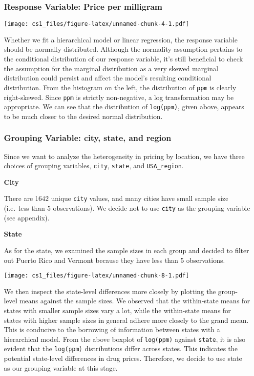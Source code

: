 \documentclass[
  11pt,
]{article}
\begin{document}
\hypertarget{response-variable-price-per-milligram}{%
\subsubsection{Response Variable: Price per
milligram}\label{response-variable-price-per-milligram}}

\texttt{[image: cs1\_files/figure-latex/unnamed-chunk-4-1.pdf]}

Whether we fit a hierarchical model or linear regression, the response
variable should be normally distributed. Although the normality
assumption pertains to the conditional distribution of our response
variable, it's still beneficial to check the assumption for the marginal
distribution as a very skewed marginal distribution could persist and
affect the model's resulting conditional distribution. From the
histogram on the left, the distribution of \texttt{ppm} is clearly
right-skewed. Since \texttt{ppm} is strictly non-negative, a log
transformation may be appropriate. We can see that the distribution of
\texttt{log(ppm)}, given above, appears to be much closer to the desired
normal distribution.

\hypertarget{grouping-variable-city-state-and-region}{%
\subsubsection{Grouping Variable: city, state, and
region}\label{grouping-variable-city-state-and-region}}

Since we want to analyze the heterogeneity in pricing by location, we
have three choices of grouping variables, \texttt{city}, \texttt{state},
and \texttt{USA\_region}.

\textbf{City}

There are 1642 unique \texttt{city} values, and many cities have small
sample size (i.e.~less than 5 observations). We decide not to use
\texttt{city} as the grouping variable (see appendix).

\textbf{State}

As for the state, we examined the sample sizes in each group and decided
to filter out Puerto Rico and Vermont because they have less than 5
observations.

\texttt{[image: cs1\_files/figure-latex/unnamed-chunk-8-1.pdf]}

We then inspect the state-level differences more closely by plotting the
group-level means against the sample sizes. We observed that the
within-state means for states with smaller sample sizes vary a lot,
while the within-state means for states with higher sample sizes in
general adhere more closely to the grand mean. This is conducive to the
borrowing of information between states with a hierarchical model. From
the above boxplot of \texttt{log(ppm)} against \texttt{state}, it is
also evident that the \texttt{log(ppm)} distributions differ across
states. This indicates the potential state-level differences in drug
prices. Therefore, we decide to use state as our grouping variable at
this stage.
\end{document}
